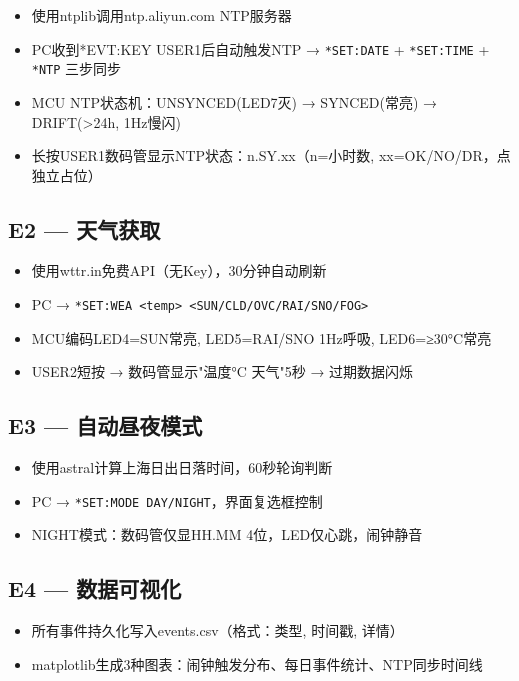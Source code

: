 \documentclass[12pt,hyperref,a4paper,UTF8]{ctexart}
\begin{document}
\begin{itemize}
    \item 使用ntplib调用ntp.aliyun.com NTP服务器
    \item PC收到*EVT:KEY USER1后自动触发NTP → \texttt{*SET:DATE} + \texttt{*SET:TIME} + \texttt{*NTP} 三步同步
    \item MCU NTP状态机：UNSYNCED(LED7灭) → SYNCED(常亮) → DRIFT(>24h, 1Hz慢闪)
    \item 长按USER1数码管显示NTP状态：n.SY.xx（n=小时数, xx=OK/NO/DR，点独立占位）
\end{itemize}

\subsection{E2 — 天气获取}

\begin{itemize}
    \item 使用wttr.in免费API（无Key），30分钟自动刷新
    \item PC → \texttt{*SET:WEA <temp> <SUN/CLD/OVC/RAI/SNO/FOG>}
    \item MCU编码LED4=SUN常亮, LED5=RAI/SNO 1Hz呼吸, LED6=≥30°C常亮
    \item USER2短按 → 数码管显示"温度°C 天气"5秒 → 过期数据闪烁
\end{itemize}

\subsection{E3 — 自动昼夜模式}

\begin{itemize}
    \item 使用astral计算上海日出日落时间，60秒轮询判断
    \item PC → \texttt{*SET:MODE DAY/NIGHT}，界面复选框控制
    \item NIGHT模式：数码管仅显HH.MM 4位，LED仅心跳，闹钟静音
\end{itemize}

\subsection{E4 — 数据可视化}

\begin{itemize}
    \item 所有事件持久化写入events.csv（格式：类型, 时间戳, 详情）
    \item matplotlib生成3种图表：闹钟触发分布、每日事件统计、NTP同步时间线
\end{itemize}
\end{document}
